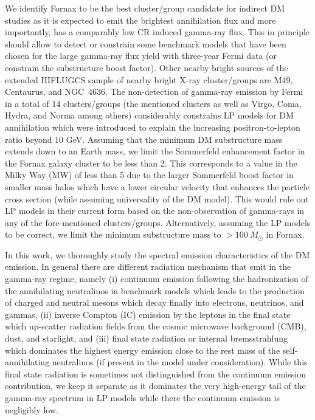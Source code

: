 \documentclass[10pt,aps,pra,reprint,amsmath,amsfonts,amssymb,showpacs,nofootinbib,floatfix]{revtex4-1}
\newcommand{\msun}{M_\odot}
\begin{document}
We identify Fornax to be the best cluster/group candidate for indirect
DM studies as it is expected to emit the brightest annihilation flux
and more importantly, has a comparably low CR induced gamma-ray flux.
This in principle should allow to detect or constrain some benchmark
models that have been chosen for the large gamma-ray flux yield with
three-year Fermi data (or constrain the substructure boost
factor). Other nearby bright sources of the extended HIFLUGCS sample
of nearby bright X-ray cluster/groups are M49, Centaurus, and
NGC~4636.  The non-detection of gamma-ray emission by Fermi in a total
of 14 clusters/groups (the mentioned clusters as well as Virgo, Coma,
Hydra, and Norma among others) considerably constrains LP models for
DM annihilation which were introduced to explain the increasing
positron-to-lepton ratio beyond 10 GeV. Assuming that the minimum DM
substructure mass extends down to an Earth mass, we limit the
Sommerfeld enhancement factor in the Fornax galaxy cluster to be less
than 2. This corresponds to a value in the Milky Way (MW) of less than
5 due to the larger Sommerfeld boost factor in smaller mass halos
which have a lower circular velocity that enhances the particle cross
section (while assuming universality of the DM model). This would rule
out LP models in their current form based on the non-observation of
gamma-rays in any of the fore-mentioned
clusters/groups. Alternatively, assuming the LP models to be correct,
we limit the minimum substructure mass to $>100~\msun$ in Fornax.

In this work, we thoroughly study the spectral emission
characteristics of the DM emission. In general there are different
radiation mechanism that emit in the gamma-ray regime, namely (i)
continuum emission following the hadronization of the annihilating
neutralinos in benchmark models which leads to the production of
charged and neutral mesons which decay finally into electrons,
neutrinos, and gammas, (ii) inverse Compton (IC) emission by the
leptons in the final state which up-scatter radiation fields from the
cosmic microwave background (CMB), dust, and starlight, and (iii) final
state radiation or internal bremsstrahlung which dominates the highest
energy emission close to the rest mass of the self-annihilating
neutralinos (if present in the model under consideration). While this
final state radiation is sometimes not distinguished from the
continuum emission contribution, we keep it separate as it dominates
the very high-energy tail of the gamma-ray spectrum in LP models while
there the continuum  emission is negligibly low.
\end{document}
